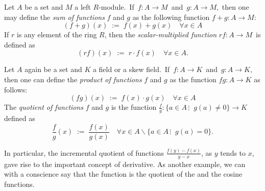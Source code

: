 \documentclass[12pt]{article}
\theoremstyle{definition}
\begin{document}
Let $A$ be a set and $M$ a left $R$-module.\, If\, $f\!: A \to M$\, and\, $g\!: A \to M$,\, then one may define the {\em sum of functions} $f$ and $g$ as the following function \;$f\!+\!g\!: A \to M$:
$$(f\!+\!g)(x) \;:=\; f(x)\!+\!g(x) \quad \forall x \in A$$
If $r$ is any element of the ring $R$, then the {\em scalar-multiplied function}\; $rf\!: A \to M$\, is defined as
$$(rf)(x) \;:=\; r\!\cdot\!f(x) \quad \forall x \in A.$$


Let $A$ again be a set and $K$ a field or a skew field.\, If\, $f\!: A \to K$\, and\, $g\!: A \to K$,\, then one can define the {\em product of functions} $f$ and $g$ as the function\; $fg\!: A \to K$ as follows:
$$(fg)(x) \;:=\; f(x)\!\cdot\!g(x) \quad \forall x \in A$$
The {\em quotient of functions} $f$ and $g$ is the function\; 
$\displaystyle\frac{f}{g}\!: \{a\in A\,\vdots\;\; g(a) \neq 0\} \to K$\; defined as
$$\frac{f}{g}(x) \;:=\; \frac{f(x)}{g(x)} \quad \forall x \in A\!\smallsetminus\!\{a\in A\,\vdots\;\; g(a) = 0\}.$$

In particular, the incremental quotient of functions $\frac{f(y)-f(x)}{y-x}$, as $y$ tends to $x$, gave rise to the important concept of derivative. As another example, we can with a  conscience say that the  function is the quotient of the  and the cosine functions.
\end{document}
